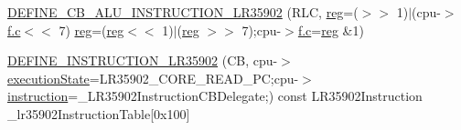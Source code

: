 \begin{DoxyCompactItemize}
\mbox{\hyperlink{isa-lr35902_8c_ae6306d8b107a657866239144d721223a}{D\+E\+F\+I\+N\+E\+\_\+\+C\+B\+\_\+\+A\+L\+U\+\_\+\+I\+N\+S\+T\+R\+U\+C\+T\+I\+O\+N\+\_\+\+L\+R35902}} (R\+LC, \mbox{\hyperlink{lr35902_2decoder_8c_af44c02f7785479603f59b662f3dfae6a}{reg}}=($>$$>$ 1)$\vert$(cpu-\/$>$\mbox{\hyperlink{isa-lr35902_8c_ab27f9f98dd173bfc694f5d161e839d6e}{f.\+c}}$<$$<$ 7) \mbox{\hyperlink{lr35902_2decoder_8c_af44c02f7785479603f59b662f3dfae6a}{reg}}=(\mbox{\hyperlink{lr35902_2decoder_8c_af44c02f7785479603f59b662f3dfae6a}{reg}}$<$$<$ 1)$\vert$(\mbox{\hyperlink{lr35902_2decoder_8c_af44c02f7785479603f59b662f3dfae6a}{reg}} $>$$>$ 7);cpu-\/$>$\mbox{\hyperlink{isa-lr35902_8c_ab27f9f98dd173bfc694f5d161e839d6e}{f.\+c}}=\mbox{\hyperlink{lr35902_2decoder_8c_af44c02f7785479603f59b662f3dfae6a}{reg}} \&1)
\item 
\mbox{\hyperlink{isa-lr35902_8c_a2c0136f44ea637ff7143f439c53d34f6}{D\+E\+F\+I\+N\+E\+\_\+\+I\+N\+S\+T\+R\+U\+C\+T\+I\+O\+N\+\_\+\+L\+R35902}} (CB, cpu-\/$>$\mbox{\hyperlink{isa-lr35902_8c_a087a53d4d283226a73c530dd2883d634}{execution\+State}}=L\+R35902\+\_\+\+C\+O\+R\+E\+\_\+\+R\+E\+A\+D\+\_\+\+PC;cpu-\/$>$\mbox{\hyperlink{isa-lr35902_8c_a516462a0e821c76277faaeb2a1364b35}{instruction}}=\+\_\+\+L\+R35902\+Instruction\+C\+B\+Delegate;) const L\+R35902\+Instruction \+\_\+lr35902\+Instruction\+Table\mbox{[}0x100\mbox{]}
\end{DoxyCompactItemize}
